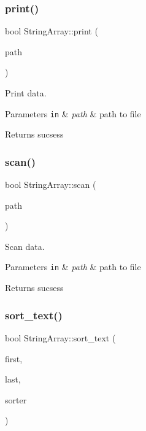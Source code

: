 \subsubsection{\texorpdfstring{print()}{print()}}
{\footnotesize\ttfamily bool String\+Array\+::print (\begin{DoxyParamCaption}\item[{const char $\ast$}]{path }\end{DoxyParamCaption})}



Print data. 


\begin{DoxyParams}[1]{Parameters}
\mbox{\tt in}  & {\em path} & path to file\\
\hline
\end{DoxyParams}
\begin{DoxyReturn}{Returns}
sucsess 
\end{DoxyReturn}
\mbox{\label{class_string_array_af548aec5f0efc6bdcb85bbc9ff3314ae}} 
\subsubsection{\texorpdfstring{scan()}{scan()}}
{\footnotesize\ttfamily bool String\+Array\+::scan (\begin{DoxyParamCaption}\item[{const char $\ast$}]{path }\end{DoxyParamCaption})}



Scan data. 


\begin{DoxyParams}[1]{Parameters}
\mbox{\tt in}  & {\em path} & path to file\\
\hline
\end{DoxyParams}
\begin{DoxyReturn}{Returns}
sucsess 
\end{DoxyReturn}
\mbox{\label{class_string_array_ada4afa2d4aa21a149cc4fa710c19d8fd}} 
\subsubsection{\texorpdfstring{sort\+\_\+text()}{sort\_text()}}
{\footnotesize\ttfamily bool String\+Array\+::sort\+\_\+text (\begin{DoxyParamCaption}\item[{int}]{first,  }\item[{int}]{last,  }\item[{bool($\ast$)(int, int, \mbox{\hyperlink{class_string_array}{String\+Array}} $\ast$)}]{sorter }\end{DoxyParamCaption})}




